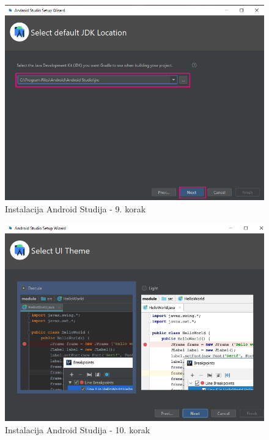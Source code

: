\documentclass[11pt,a4paper,twoside]{article}
\begin{document}
\begin{figure}[!h]
	\centering
	\includegraphics[width=\textwidth]{install_09.png}
	\caption{Instalacija Android Studija - 9. korak}
	\label{fig:install_09}	
\end{figure}

\begin{figure}[!h]
	\centering
	\includegraphics[width=\textwidth]{install_10.png}
	\caption{Instalacija Android Studija - 10. korak}
	\label{fig:install_10}	
\end{figure}
\end{document}
